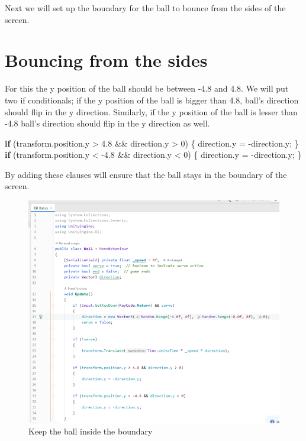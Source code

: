 \documentclass[
]{book}
\newenvironment{Shaded}{\begin{snugshade}}{\end{snugshade}}
\newcommand{\DecValTok}[1]{\textcolor[rgb]{0.00,0.00,0.81}{#1}}
\newcommand{\FloatTok}[1]{\textcolor[rgb]{0.00,0.00,0.81}{#1}}
\newcommand{\FunctionTok}[1]{\textcolor[rgb]{0.00,0.00,0.00}{#1}}
\newcommand{\KeywordTok}[1]{\textcolor[rgb]{0.13,0.29,0.53}{\textbf{#1}}}
\newcommand{\NormalTok}[1]{#1}
\begin{document}
Next we will set up the boundary for the ball to bounce from the sides of the screen.

\hypertarget{bouncing-from-the-sides}{%
\section{Bouncing from the sides}\label{bouncing-from-the-sides}}

For this the y position of the ball should be between -4.8 and 4.8. We will put two if conditionals; if the y position of the ball is bigger than 4.8, ball's direction should flip in the y direction. Similarly, if the y position of the ball is lesser than -4.8 ball's direction should flip in the y direction as well.

\begin{Shaded}
\begin{Highlighting}[]
\KeywordTok{if}\NormalTok{ (transform.}\FunctionTok{position}\NormalTok{.}\FunctionTok{y}\NormalTok{ > }\FloatTok{4.8}\NormalTok{ && direction.}\FunctionTok{y}\NormalTok{ > }\DecValTok{0}\NormalTok{)}
\NormalTok{\{}
\NormalTok{  direction.}\FunctionTok{y}\NormalTok{ = -direction.}\FunctionTok{y}\NormalTok{;}
\NormalTok{\}}
\KeywordTok{if}\NormalTok{ (transform.}\FunctionTok{position}\NormalTok{.}\FunctionTok{y}\NormalTok{ < }\FloatTok{-4.8}\NormalTok{ && direction.}\FunctionTok{y}\NormalTok{ < }\DecValTok{0}\NormalTok{)}
\NormalTok{\{}
\NormalTok{  direction.}\FunctionTok{y}\NormalTok{ = -direction.}\FunctionTok{y}\NormalTok{;}
\NormalTok{\}}
\end{Highlighting}
\end{Shaded}

By adding these clauses will ensure that the ball stays in the boundary of the screen.

\begin{figure}
\centering
\includegraphics{Images/BallBoundary.png}
\caption{Keep the ball inside the boundary}
\end{figure}
\end{document}
